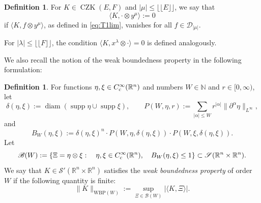\documentclass[11pt, reqno]{amsart}
\theoremstyle{definition}
\newtheorem{definition}[theorem]{Definition}
\theoremstyle{remark}
\numberwithin{equation}{section}
\newcommand{\N}{\mathbb N}
\newcommand{\R}{\mathbb R}
\newcommand{\supp}{\operatorname{supp}}
\newcommand{\Floor}[1]{\lfloor\!\lfloor #1 \rfloor\!\rfloor}
\newcommand{\pair}[2]{\langle #1, #2 \rangle}
\newcommand{\abs}[1]{|#1|}
\newcommand{\Norm}[2]{\|#1\|_{#2}}
\begin{document}
\begin{definition}\label{def:T1=0}
For $K\in\operatorname{CZK}(E,F)$ and $\abs{\mu}\leq\Floor{E}$, we say that
\begin{equation*}
  \pair{K}{\cdot\otimes y^\mu}:=0
\end{equation*}
if $\pair{K}{f\otimes y^\mu}$, as defined in \eqref{eq:T1lim}, vanishes for all $f\in\mathcal D_{\abs{\mu}}$.

For $\abs{\lambda}\leq\Floor{F}$, the condition $ \pair{K}{x^\lambda\otimes\cdot}=0$ is defined analogously.
\end{definition}


We also recall the notion of the weak boundedness property in the following formulation:

\begin{definition}\label{def:WBP1}
For functions $\eta,\xi\in C_{\rm c}^\infty(\R^n)$ and numbers $W\in\N$ and $r\in[0,\infty)$, let
\begin{equation*}
   \delta(\eta,\xi):=\operatorname{diam}(\supp \eta\cup\supp \xi),\qquad
  P(W,\eta,r):=\sum_{\abs{\alpha}\leq W} r^{\abs{\alpha}}\Norm{\partial^\alpha \eta}{L^\infty},
\end{equation*}
and
\begin{equation*}
  B_{W}(\eta,\xi)
  :=\delta(\eta,\xi)^{n}\cdot P(W,\eta,\delta(\eta,\xi))\cdot P(W,\xi,\delta(\eta,\xi)).
\end{equation*}
Let
\begin{equation*}
  \mathscr B(W):=\{\Xi=\eta\otimes\xi:\quad \eta,\xi\in C_{\rm c}^\infty(\R^n),\quad
  B_W(\eta,\xi)\leq 1\}
  \subset\mathscr S(\R^n\times\R^n).
\end{equation*}
We say that $K\in\mathscr S'(\mathbb R^{n}\times\mathbb R^{n})$ satisfies the \emph{weak boundedness property} of order $W$ if the following quantity is finite:
\begin{equation*}
  \Norm{K}{\mathrm{WBP}(W)}
   :=\sup_{\Xi\in\mathscr B(W)} \abs{\pair{K}{\Xi}}.
\end{equation*}
\end{definition}
\end{document}
